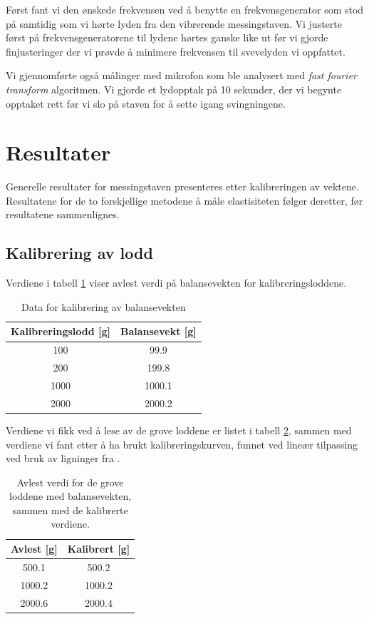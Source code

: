 \documentclass[a4paper,11pt, twocolumn]{article}
\begin{document}
Først fant vi den ønskede frekvensen ved å benytte en frekvensgenerator som stod på samtidig som vi hørte lyden fra den vibrerende messingstaven. Vi justerte først på frekvensgeneratorene til lydene hørtes ganske like ut før vi gjorde finjusteringer der vi prøvde å minimere frekvensen til svevelyden vi oppfattet.

Vi gjennomførte også målinger med mikrofon som ble analysert med \textit{fast fourier transform} algoritmen. Vi gjorde et lydopptak på 10 sekunder, der vi begynte opptaket rett før vi slo på staven for å sette igang svingningene.

\section{Resultater}
Generelle resultater for messingstaven presenteres etter kalibreringen av vektene. Resultatene for de to forskjellige metodene å måle elastisiteten følger deretter, før resultatene sammenlignes.

\subsection{Kalibrering av lodd}

Verdiene i tabell \ref{tab:kalibrering} viser avlest verdi på balansevekten for kalibreringsloddene.

\begin{table}[!ht]
\centering
\caption{Data for kalibrering av balansevekten}
\label{tab:kalibrering}
\begin{tabular}{cc}
	\toprule
	\toprule
	Kalibreringslodd [g] & Balansevekt [g]\\
	\hline
	100 & 99.9\\
	200 & 199.8\\
	1000 & 1000.1\\
	2000 & 2000.2\\
	\toprule
\end{tabular}
\end{table}

Verdiene vi fikk ved å lese av de grove loddene er listet i tabell \ref{tab:kalibrert}, sammen med verdiene vi fant etter å ha brukt kalibreringskurven, funnet ved lineær tilpassing ved bruk av ligninger fra \cite[s. 39]{squires}.

\begin{table}[!ht]
\centering
\caption{Avlest verdi for de grove loddene med balansevekten, sammen med de kalibrerte verdiene.}
\label{tab:kalibrert}
\begin{tabular}{cc}
	\toprule
	\toprule
	Avlest [g] & Kalibrert [g]\\
	\hline
	500.1 & 500.2\\
	1000.2 & 1000.2\\
	2000.6 & 2000.4\\
	\toprule
\end{tabular}
\end{table}
\end{document}
